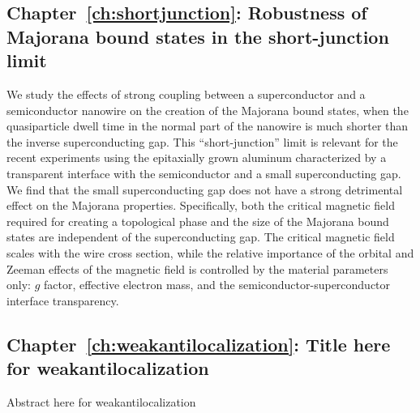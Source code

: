 \subsection{Chapter~\ref{ch:shortjunction}: Robustness of Majorana bound states in the short-junction limit}
We study the effects of strong coupling between a superconductor and a semiconductor nanowire on the creation of the Majorana bound states, when the quasiparticle dwell time in the normal part of the nanowire is much shorter than the inverse superconducting gap.
This ``short-junction'' limit is relevant for the recent experiments using the epitaxially grown aluminum characterized by a transparent interface with the semiconductor and a small superconducting gap.
We find that the small superconducting gap does not have a strong detrimental effect on the Majorana properties.
Specifically, both the critical magnetic field required for creating a topological phase and the size of the Majorana bound states are independent of the superconducting gap.
The critical magnetic field scales with the wire cross section, while the relative importance of the orbital and Zeeman effects of the magnetic field is controlled by the material parameters only: $g$ factor, effective electron mass, and the semiconductor-superconductor interface transparency.

\subsection{Chapter~\ref{ch:weakantilocalization}: Title here for weakantilocalization}
Abstract here for weakantilocalization
\vspace{1mm}




